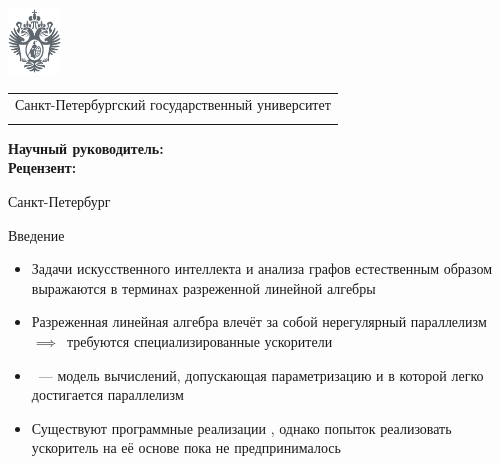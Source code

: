 \documentclass
  [ russian
  , aspectratio=169 %
  ] {beamer}
\title[Lamagraph: Транслятор в Interaction Nets]{\my@title@title@ru}
\author[\my@title@author@ru]{\my@title@author@ru, группа \academicGroup}
\institute[СПбГУ]{}
\date[25 апреля 2025 г.]{}
\makeatletter
\newcommand{\advisorChair}{\my@title@chair@ru}
\newcommand{\supervisor}{\my@title@supervisor@ru}
\newcommand{\supervisorPosition}{\my@title@supervisorPosition@ru}
\newcommand{\consultant}{\my@title@consultant@ru}
\newcommand{\consultantPosition}{\my@title@consultantPosition@ru}
\newcommand{\reviewer}{\my@title@reviewer@ru}
\newcommand{\reviewerPosition}{\my@title@reviewerPosition@ru}
\newcommand{\defenseYear}{\my@title@year@ru}
\makeatother
\begin{document}
{
\begin{frame}
    \includegraphics[width=1.4cm]{figures/герб_серый.png}
    \vspace{-35pt}
    \hspace{-10pt}
    \begin{center}
        \begin{tabular}{c}
            \scriptsize{Санкт-Петербургский государственный университет} \\
            \scriptsize{\advisorChair}
        \end{tabular}
        \titlepage
    \end{center}

    \btVFill

    {\scriptsize
        \textbf{Научный руководитель:}  \supervisorPosition~\supervisor \\
        \textbf{Рецензент:} \reviewerPosition~\reviewer \\
    }
    \makeatother
    \begin{center}
        \vspace{5pt}
        \scriptsize{Санкт-Петербург\\ \defenseYear}
    \end{center}
\end{frame}
}

\begin{frame}{Введение}

    \begin{itemize}
        \item Задачи искусственного интеллекта и анализа графов естественным образом выражаются в терминах разреженной линейной алгебры
        \item Разреженная линейная алгебра влечёт за собой нерегулярный параллелизм $\implies$~требуются специализированные ускорители
        \item \INs{}~--- модель вычислений, допускающая параметризацию и в которой легко достигается параллелизм
        \item Существуют программные реализации \INs{}, однако попыток реализовать ускоритель на её основе пока не предпринималось
    \end{itemize}

\end{frame}
\end{document}
